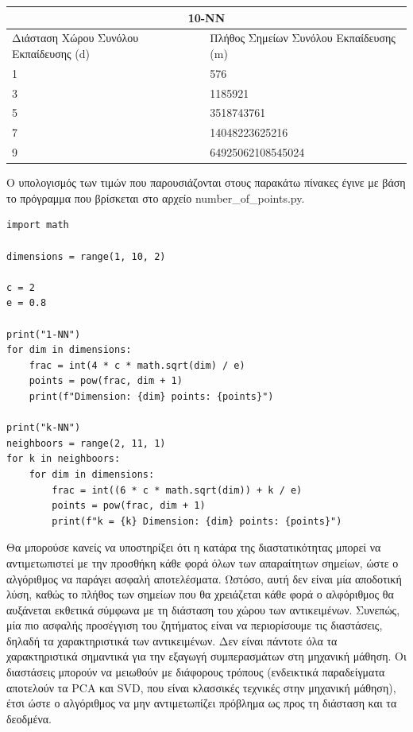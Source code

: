 \documentclass[12pt]{article}
\begin{document}
\medspace

\begin{tabular}{ |p{8cm}|p{8cm}|  }
	\hline
	\multicolumn{2}{|c|}{10-NN} \\
	\hline
	Διάσταση Χώρου Συνόλου Εκπαίδευσης (d) & Πλήθος Σημείων Συνόλου Εκπαίδευσης (m)\\
	\hline
	1   & 576    \\
	3   & 1185921    \\
	5   & 3518743761    \\
	7   & 14048223625216    \\
	9   & 64925062108545024    \\
	\hline
\end{tabular}

\medspace

Ο υπολογισμός των τιμών που παρουσιάζονται στους παρακάτω πίνακες έγινε με βάση το πρόγραμμα που βρίσκεται στο αρχείο number\_of\_points.py. \\

\begin{lstlisting}
import math

dimensions = range(1, 10, 2)

c = 2
e = 0.8

print("1-NN")
for dim in dimensions:
	frac = int(4 * c * math.sqrt(dim) / e)
	points = pow(frac, dim + 1)
	print(f"Dimension: {dim} points: {points}")

print("k-NN")
neighboors = range(2, 11, 1)
for k in neighboors:
	for dim in dimensions:
		frac = int((6 * c * math.sqrt(dim)) + k / e)
		points = pow(frac, dim + 1)
		print(f"k = {k} Dimension: {dim} points: {points}")            
\end{lstlisting}

Θα μπορούσε κανείς να υποστηρίξει ότι η κατάρα της διαστατικότητας μπορεί να αντιμετωπιστεί με την προσθήκη κάθε φορά όλων των απαραίτητων σημείων, ώστε ο αλγόριθμος να παράγει ασφαλή αποτελέσματα. Ωστόσο, αυτή δεν είναι μία αποδοτική λύση, καθώς το πλήθος των σημείων που θα χρειάζεται κάθε φορά ο αλφόριθμος θα αυξάνεται εκθετικά σύμφωνα με τη διάσταση του χώρου των αντικειμένων. Συνεπώς, μία πιο ασφαλής προσέγγιση του ζητήματος είναι να περιορίσουμε τις διαστάσεις, δηλαδή τα χαρακτηριστικά των αντικειμένων. Δεν είναι πάντοτε όλα τα χαρακτηριστικά σημαντικά για την εξαγωγή συμπερασμάτων στη μηχανική μάθηση. Οι διαστάσεις μπορούν να μειωθούν με διάφορους τρόπους (ενδεικτικά παραδείγματα αποτελούν τα PCA και SVD, που είναι κλασσικές τεχνικές στην μηχανική μάθηση), έτσι ώστε ο αλγόριθμος να μην αντιμετωπίζει πρόβλημα ως προς τη διάσταση και τα δεοδμένα. 
\end{document}
